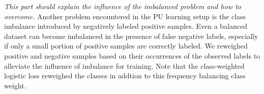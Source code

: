 \noindent
\textit{This part should explain the influence of the imbalanced problem and how to overcome.}
\noindent
Another problem encountered in the PU learning setup is the class imbalance introduced by negatively labeled positive samples.
Even a balanced dataset can become imbalanced in the presence of false negative labels, especially if only a small portion of positive samples are correctly labeled.
We reweighed positive and negative samples based on their occurrences of the observed labels to alleviate the influence of imbalance for training.
Note that the class-weighted logistic loss reweighed the classes in addtion to this frequency balancing class weight.
